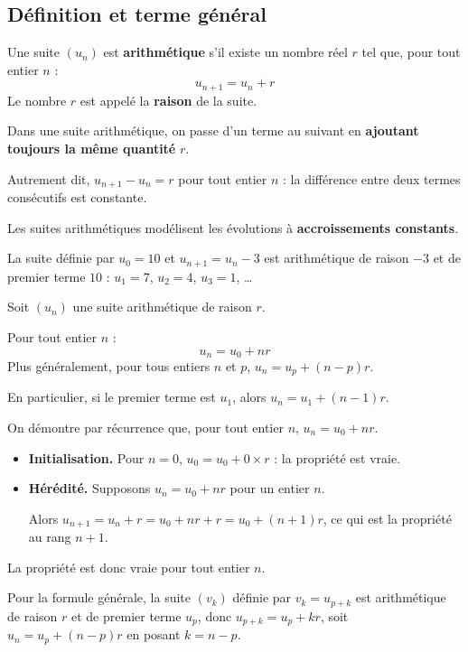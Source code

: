 \documentclass{poly}
\begin{document}
\subsection{Définition et terme général}

\begin{defin}
	Une suite $(u_n)$ est \textbf{arithmétique} s'il existe un nombre réel $r$ tel que, pour tout entier $n$ :
	\[
		u_{n+1} = u_n + r
	\]
	Le nombre $r$ est appelé la \textbf{raison} de la suite.
\end{defin}

\begin{rem}
	Dans une suite arithmétique, on passe d'un terme au suivant en \textbf{ajoutant toujours la même quantité} $r$.

	Autrement dit, $u_{n+1} - u_n = r$ pour tout entier $n$ : la différence entre deux termes consécutifs est constante.

	Les suites arithmétiques modélisent les évolutions à \textbf{accroissements constants}.
\end{rem}

\begin{ex}
	La suite définie par $u_0 = 10$ et $u_{n+1} = u_n - 3$ est arithmétique de raison $-3$ et de premier terme $10$ : $u_1 = 7$, $u_2 = 4$, $u_3 = 1$, \dots
\end{ex}

\begin{propriete}
	Soit $(u_n)$ une suite arithmétique de raison $r$.

	Pour tout entier $n$ :
	\[
		u_n = u_0 + nr
	\]
	Plus généralement, pour tous entiers $n$ et $p$, $u_n = u_p + (n - p)r$.

	En particulier, si le premier terme est $u_1$, alors $u_n = u_1 + (n - 1)r$.
\end{propriete}

\begin{demonstration}
	On démontre par récurrence que, pour tout entier $n$, $u_n = u_0 + nr$.
	\begin{itemize}
		\item \textbf{Initialisation.} Pour $n = 0$, $u_0 = u_0 + 0 \times r$ : la propriété est vraie.
		\item \textbf{Hérédité.} Supposons $u_n = u_0 + nr$ pour un entier $n$.

		      Alors $u_{n+1} = u_n + r = u_0 + nr + r = u_0 + (n + 1)r$, ce qui est la propriété au rang $n + 1$.
	\end{itemize}
	La propriété est donc vraie pour tout entier $n$.

	Pour la formule générale, la suite $(v_k)$ définie par $v_k = u_{p+k}$ est arithmétique de raison $r$ et de premier terme $u_p$, donc $u_{p+k} = u_p + kr$, soit $u_n = u_p + (n - p)r$ en posant $k = n - p$.
\end{demonstration}
\end{document}
